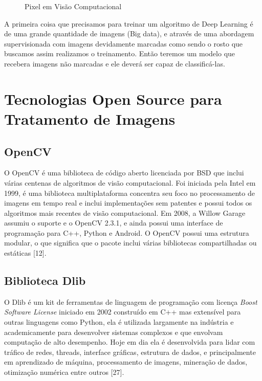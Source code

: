 \begin{figure}[H]
	\centering
	\caption{Pixel em Visão Computacional}
	\def\svgwidth{10cm}
	
	\label{fig:pixel}
\end{figure}

A primeira coisa que precisamos para treinar um algoritmo de Deep Learning é de uma grande quantidade de imagens (Big data), e através de uma abordagem supervisionada com imagens devidamente marcadas como sendo o rosto que buscamos assim realizamos o treinamento. Então teremos um modelo que recebera imagens não marcadas e ele deverá ser capaz de classificá-las.
\section{Tecnologias Open Source para Tratamento de Imagens}

\subsection{OpenCV}
O OpenCV é uma biblioteca de código aberto licenciada por BSD que inclui várias centenas de algoritmos de visão computacional.
Foi iniciada pela Intel em 1999, é uma biblioteca multiplataforma concentra seu foco no processamento de imagens em tempo real e inclui implementações sem patentes e possui todos os algoritmos mais recentes de visão computacional. Em 2008, a Willow Garage assumiu o suporte e o OpenCV 2.3.1, e ainda possui uma interface de programação para C++, Python e Android.
O OpenCV possui uma estrutura modular, o que significa que o pacote inclui várias bibliotecas compartilhadas ou estáticas [12].
\subsection{Biblioteca Dlib}
O Dlib é um kit de ferramentas de linguagem de programação com licença \textit{Boost Software License} iniciado em 2002 construído em C++ mas extensível para outras linguagens como Python, ela é utilizada largamente na indústria e academicamente para desenvolver sistemas complexos e que envolvam computação de alto desempenho. Hoje em dia ela é desenvolvida para lidar com tráfico de redes, threads, interface gráficas, estrutura de dados, e principalmente em aprendizado de máquina, processamento de imagens, mineração de dados, otimização numérica entre outros [27].
